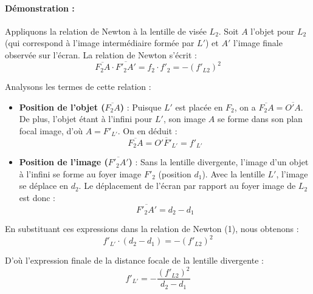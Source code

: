 \paragraph{Démonstration :}
Appliquons la relation de Newton à la lentille de visée $L_2$. Soit $A$ l'objet pour $L_2$ (qui correspond à l'image intermédiaire formée par $L'$) et $A'$ l'image finale observée sur l'écran. La relation de Newton s'écrit :
\begin{equation}
    \overline{F_2 A} \cdot \overline{F'_2 A'} = f_2 \cdot f'_2 = -(f'_{L2})^2
\end{equation}

Analysons les termes de cette relation :
\begin{itemize}
    \item \textbf{Position de l'objet ($\overline{F_2 A}$)} : Puisque $L'$ est placée en $F_2$, on a $\overline{F_2 A} = \overline{O' A}$. De plus, l'objet étant à l'infini pour $L'$, son image $A$ se forme dans son plan focal image, d'où $A = F'_{L'}$. On en déduit :
    \begin{equation}
        \overline{F_2 A} = \overline{O' F'_{L'}} = f'_{L'}
    \end{equation}
    
    \item \textbf{Position de l'image ($\overline{F'_2 A'}$)} : Sans la lentille divergente, l'image d'un objet à l'infini se forme au foyer image $F'_2$ (position $d_1$). Avec la lentille $L'$, l'image se déplace en $d_2$. Le déplacement de l'écran par rapport au foyer image de $L_2$ est donc :
    \begin{equation}
        \overline{F'_2 A'} = d_2 - d_1
    \end{equation}
\end{itemize}

En substituant ces expressions dans la relation de Newton (1), nous obtenons :
\begin{equation}
    f'_{L'} \cdot (d_2 - d_1) = -(f'_{L2})^2
\end{equation}

D'où l'expression finale de la distance focale de la lentille divergente :
\begin{equation}
    f'_{L'} = -\frac{(f'_{L2})^2}{d_2 - d_1}
\end{equation}